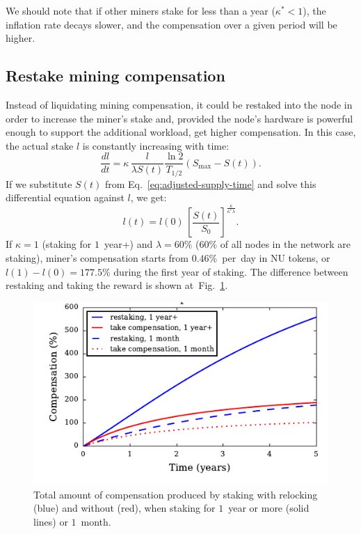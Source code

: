 \documentclass[longbibliography,nofootinbib,twocolumn]{revtex4-1}
\newcommand{\figref}[1]{Fig.~\ref{#1}}
\begin{document}
We should note that if other miners stake for less than a year ($\kappa^* < 1$), the inflation rate decays slower, and the compensation over a given period
will be higher.

\subsection{Restake mining compensation}

Instead of liquidating mining compensation, it could be restaked into the node in order to increase the miner's stake and, provided the node's hardware is
powerful enough to support the additional workload, get higher compensation.
In this case, the actual stake $l$ is constantly increasing with time:
\begin{equation}
    \frac{dl}{dt} =  \kappa\, \frac{l}{\lambda S(t)} \frac{\ln{2}}{T_{1/2}} \left( S_{\max} - S(t)\right).
\end{equation}
If we substitute $S(t)$ from Eq.~\ref{eq:adjusted-supply-time} and solve this differential equation against $l$, we get:
\begin{equation}
    l(t) = l(0)\,\left[ \frac{S(t)}{S_0} \right]^{\frac{\kappa}{\kappa^* \lambda}}.
\end{equation}
If $\kappa=1$ (staking for $1$~year+) and $\lambda=60\%$ ($60\%$ of all nodes in the network are staking),
miner's compensation starts from $0.46\%$~per~day in NU tokens,
or $l(1) - l(0) = 177.5\%$ during the first year of staking.
The difference between restaking and taking the reward is shown at~\figref{fig:total-compensation}.


\begin{figure}
    \includegraphics[width=\columnwidth]{pdf/total-compensation.pdf}
    \caption{Total amount of compensation produced by staking with relocking (blue) and without (red),
        when staking for $1$~year or more (solid lines) or $1$~month.}
    \label{fig:total-compensation}
\end{figure}
\end{document}
